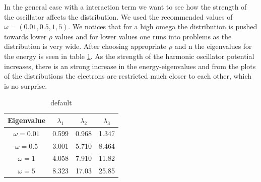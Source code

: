 \documentclass[a4paper,11pt]{article}
\begin{document}
{In the general case with a interaction term we want to see how the strength of the oscillator affects the distribution. We used the recommended values of $\omega = (0.01, 0.5, 1, 5)$. We notices that for a high omega the distribution is pushed towards lower $\rho$ values and for lower values one runs into problems as the distribution is very wide. After choosing appropriate $\rho$ and n the eigenvalues for the energy is seen in table \ref{tab:varying_omega}. As the strength of the harmonic oscillator potential increases, there is an strong increase in the energy-eigenvalues and from the plots of the distributions the electrons are restricted much closer to each other, which is no surprise. 

\begin{table}
\caption{default}
\begin{center}
\begin{tabular}{|c||c|c|c|}
\hline
Eigenvalue & $\lambda_1$ & $\lambda_2$ & $\lambda_3$ \\
\hline
\hline
$\omega=0.01$ & 0.599 & 0.968 & 1.347  \\
\hline
$\omega=0.5$ & 3.001 & 5.710 & 8.464 \\
\hline
$\omega=1$ & 4.058 & 7.910 & 11.82 \\
\hline
$\omega=5$ & 8.323 & 17.03 & 25.85 \\
\hline
\end{tabular}
\end{center}
\label{tab:varying_omega}
\end{table}%



}
\end{document}
